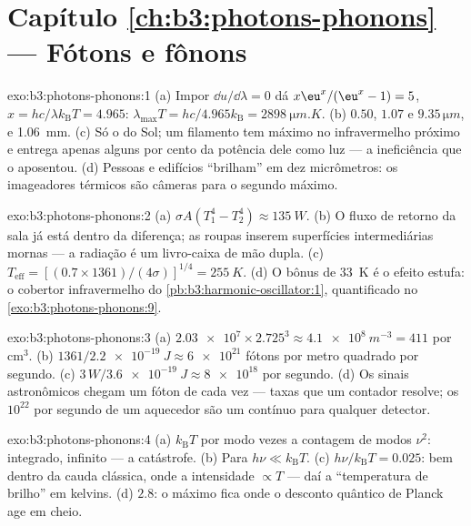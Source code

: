 \section*{Capítulo \ref{ch:b3:photons-phonons} --- Fótons e fônons}

\begin{solution}{exo:b3:photons-phonons:1}
(a) Impor $\dd u/\dd\lambda = 0$ dá $x\eu^x/(\eu^x - 1) = 5$,
$x = hc/\lambda k_{\text{B}}T = 4.965$: $\lambda_{\max}T =
hc/4.965k_{\text{B}} = \qty{2898}{\micro m.K}$. (b) $0.50$,
$1.07$ e $9.35\,\unit{\micro m}$, e \qty{1.06}{mm}. (c) Só o do
Sol; um filamento tem máximo no infravermelho próximo e entrega apenas
alguns por cento da potência dele como luz --- a ineficiência que o
aposentou. (d) Pessoas e edifícios ``brilham'' em dez micrômetros:
os imageadores térmicos são câmeras para o segundo máximo.
\end{solution}

\begin{solution}{exo:b3:photons-phonons:2}
(a) $\sigma A(T_1^4 - T_2^4) \approx \qty{135}{W}$. (b) O fluxo de
retorno da sala já está dentro da diferença; as roupas inserem
superfícies intermediárias mornas --- a radiação é um livro-caixa de
mão dupla. (c)
$T_{\text{eff}} = [(0.7 \times 1361)/(4\sigma)]^{1/4} =
\qty{255}{K}$. (d) O bônus de \qty{33}{K} é o efeito estufa:
o cobertor infravermelho do
\cref{pb:b3:harmonic-oscillator:1}, quantificado no
\cref{exo:b3:photons-phonons:9}.
\end{solution}

\begin{solution}{exo:b3:photons-phonons:3}
(a) $\num{2.03e7} \times 2.725^3 \approx \qty{4.1e8}{m^{-3}} =
411$ por cm$^3$. (b) $1361/\qty{2.2e-19}{J} \approx
\num{6e21}$ fótons por metro quadrado por segundo. (c) $3\,\unit{W}/
\qty{3.6e-19}{J} \approx \num{8e18}$ por segundo. (d) Os sinais
astronômicos chegam um fóton de cada vez --- taxas que um contador
resolve; os $10^{22}$ por segundo de um aquecedor são um contínuo para
qualquer detector.
\end{solution}

\begin{solution}{exo:b3:photons-phonons:4}
(a) $k_{\text{B}}T$ por modo vezes a contagem de modos $\nu^2$:
integrado, infinito --- a catástrofe. (b) Para $h\nu \ll
k_{\text{B}}T$. (c) $h\nu/k_{\text{B}}T = 0.025$: bem dentro da
cauda clássica, onde a intensidade $\propto T$ --- daí a
``temperatura de brilho'' em kelvins. (d) $2.8$: o máximo fica
onde o desconto quântico de Planck age em cheio.
\end{solution}


